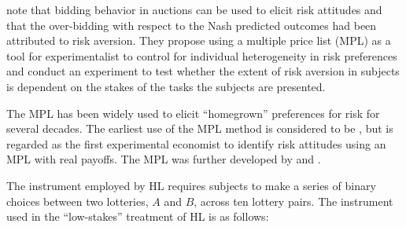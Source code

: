 \documentclass[../main.tex]{subfiles}
\begin{document}
\textcite[1644]{Holt2002} note that bidding behavior in auctions can be used to elicit risk attitudes and that the over-bidding with respect to the Nash predicted outcomes had been attributed to risk aversion.
They propose using a multiple price list (MPL) as a tool for experimentalist to control for individual heterogeneity in risk preferences and conduct an experiment to test whether the extent of risk aversion in subjects is dependent on the stakes of the tasks the subjects are presented.

 
The MPL has been widely used to elicit \enquote{homegrown} preferences for risk for several decades.
The earliest use of the MPL method is considered to be \textcite{Miller1969}, but \textcite{Binswanger1980, Binswanger1981} is regarded as the first experimental economist to identify risk attitudes using an MPL with real payoffs.
The MPL was further developed by \textcite{Schubert1999} and \textcite{Holt2002}.

The instrument employed by HL requires subjects to make a series of binary choices between two lotteries, $A$ and $B$, across ten lottery pairs.
The instrument used in the \enquote{low-stakes} treatment of HL is as follows:
\end{document}
